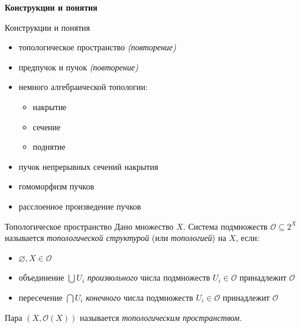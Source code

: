 \documentclass{beamer}
\begin{document}
\begin{frame}{}
\begin{center}
	\textbf{Конструкции и понятия}
\end{center}
\end{frame}

\begin{frame}{Конструкции и понятия}
\begin{itemize}
	\item топологическое пространство {\small \textit{(повторение)}}
	\item предпучок и пучок {\small \textit{(повторение)}}
	\item немного алгебраической топологии:
		\begin{itemize}
			\item накрытие
			\item сечение
			\item поднятие
		\end{itemize}
	\item пучок непрерывных сечений накрытия
	\item гомоморфизм пучков
	\item расслоенное произведение пучков
\end{itemize}
\end{frame}

\begin{frame}{Топологическое пространство}
Дано множество $X$. Система подмножеств $\mathcal{O} \subseteq 2^X$ называется \textit{топологической структурой} (или \textit{топологией}) на $X$, если:\\
\bigskip
\begin{itemize}
	\item $\varnothing, X \in \mathcal{O}$
	\item объединение $\bigcup U_i$ \textit{произвольного} числа подмножеств $U_i \in \mathcal{O}$ принадлежит $\mathcal{O}$
	\item пересечение $\bigcap U_i$ \textit{конечного} числа подмножеств $U_i \in \mathcal{O}$ принадлежит $\mathcal{O}$
\end{itemize}
\bigskip
Пара $(X, \mathcal{O}(X))$ называется \textit{топологическим пространством}.
\end{frame}
\end{document}
